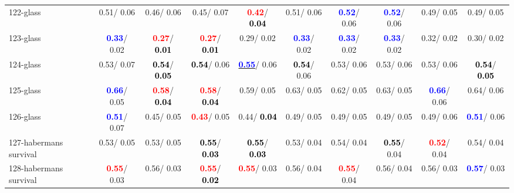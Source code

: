 \begin{table}[h]
\begin{center}
{\begin{tabular}{lc|c|c|c|c|c|c|c|c}
122-glass &   0.51/  0.06 &   0.46/  0.06 &   0.45/  0.07 & \textcolor{red}{\textbf{  0.42}}/\textcolor{black}{\textbf{  0.04}} &   0.51/  0.06 & \textcolor{blue}{\textbf{  0.52}}/  0.06 & \textcolor{blue}{\textbf{  0.52}}/  0.06 &   0.49/  0.05 &   0.49/  0.05 \\
123-glass & \textcolor{blue}{\textbf{  0.33}}/  0.02 & \textcolor{red}{\textbf{  0.27}}/\textcolor{black}{\textbf{  0.01}} & \textcolor{red}{\textbf{  0.27}}/\textcolor{black}{\textbf{  0.01}} &   0.29/  0.02 & \textcolor{blue}{\textbf{  0.33}}/  0.02 & \textcolor{blue}{\textbf{  0.33}}/  0.02 & \textcolor{blue}{\textbf{  0.33}}/  0.02 &   0.32/  0.02 &   0.30/  0.02 \\
124-glass &   0.53/  0.07 & \textcolor{black}{\textbf{  0.54}}/\textcolor{black}{\textbf{  0.05}} & \textcolor{black}{\textbf{  0.54}}/  0.06 & \underline{\textcolor{blue}{\textbf{  0.55}}}/  0.06 & \textcolor{black}{\textbf{  0.54}}/  0.06 &   0.53/  0.06 &   0.53/  0.06 &   0.53/  0.06 & \textcolor{black}{\textbf{  0.54}}/\textcolor{black}{\textbf{  0.05}} \\ \hline
125-glass & \textcolor{blue}{\textbf{  0.66}}/  0.05 & \textcolor{red}{\textbf{  0.58}}/\textcolor{black}{\textbf{  0.04}} & \textcolor{red}{\textbf{  0.58}}/\textcolor{black}{\textbf{  0.04}} &   0.59/  0.05 &   0.63/  0.05 &   0.62/  0.05 &   0.63/  0.05 & \textcolor{blue}{\textbf{  0.66}}/  0.06 &   0.64/  0.06 \\
126-glass & \textcolor{blue}{\textbf{  0.51}}/  0.07 &   0.45/  0.05 & \textcolor{red}{\textbf{  0.43}}/  0.05 &   0.44/\textcolor{black}{\textbf{  0.04}} &   0.49/  0.05 &   0.49/  0.05 &   0.49/  0.05 &   0.49/  0.06 & \textcolor{blue}{\textbf{  0.51}}/  0.06 \\
127-habermans survival &   0.53/  0.05 &   0.53/  0.05 & \textcolor{black}{\textbf{  0.55}}/\textcolor{black}{\textbf{  0.03}} & \textcolor{black}{\textbf{  0.55}}/\textcolor{black}{\textbf{  0.03}} &   0.53/  0.04 &   0.54/  0.04 & \textcolor{black}{\textbf{  0.55}}/  0.04 & \textcolor{red}{\textbf{  0.52}}/  0.04 &   0.54/  0.04 \\
128-habermans survival & \textcolor{red}{\textbf{  0.55}}/  0.03 &   0.56/  0.03 & \textcolor{red}{\textbf{  0.55}}/\textcolor{black}{\textbf{  0.02}} & \textcolor{red}{\textbf{  0.55}}/  0.03 &   0.56/  0.04 & \textcolor{red}{\textbf{  0.55}}/  0.04 &   0.56/  0.04 &   0.56/  0.03 & \textcolor{blue}{\textbf{  0.57}}/  0.03 \\\end{tabular}}\label{stratsALCKappa3Allallb}
\end{center}
\end{table}
